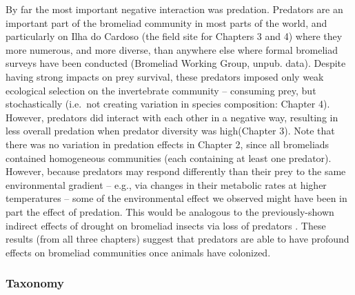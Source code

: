 By far the most important negative interaction was predation. Predators
are an important part of the bromeliad community in most parts of the
world, and particularly on Ilha do Cardoso (the field site for Chapters
3 and 4) where they more numerous, and more diverse, than anywhere else
where formal bromeliad surveys have been conducted (Bromeliad Working
Group, unpub. data). Despite having strong impacts on prey survival,
these predators imposed only weak ecological selection on the
invertebrate community -- consuming prey, but stochastically (i.e.~not
creating variation in species composition: Chapter 4). However,
predators did interact with each other in a negative way, resulting in
less overall predation when predator diversity was high(Chapter 3). Note
that there was no variation in predation effects in Chapter 2, since all
bromeliads contained homogeneous communities (each containing at least
one predator). However, because predators may respond differently than
their prey to the same environmental gradient -- e.g., via changes in
their metabolic rates at higher temperatures -- some of the
environmental effect we observed might have been in part the effect of
predation. This would be analogous to the previously-shown indirect
effects of drought on bromeliad insects via loss of predators
\citep{amundrud}. These results (from all three chapters) suggest that
predators are able to have profound effects on bromeliad communities
once animals have colonized.

\subsubsection{Taxonomy}\label{taxonomy}


